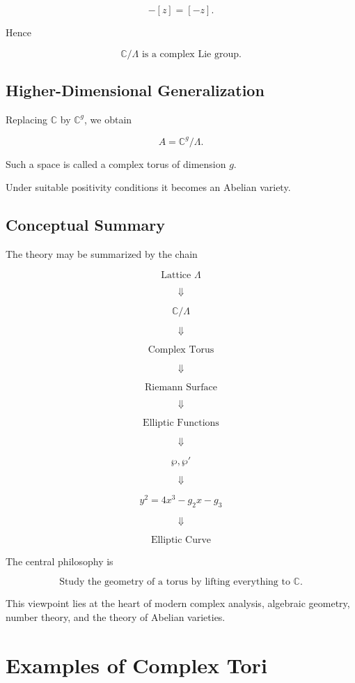 \documentclass[12pt,a4paper]{article}
\theoremstyle{notespace}
\begin{document}
\[
-[z]=[-z].
\]

Hence

\[
\boxed{
	\mathbb C/\Lambda
	\text{ is a complex Lie group.}
}
\]

\subsection{Higher-Dimensional Generalization}

Replacing \(\mathbb C\) by \(\mathbb C^g\), we obtain

\[
A
=
\mathbb C^g/\Lambda.
\]

Such a space is called a complex torus of dimension \(g\).

Under suitable positivity conditions it becomes an Abelian variety.

\subsection{Conceptual Summary}

The theory may be summarized by the chain

\[
\boxed{\text{Lattice } \Lambda}
\]

\[
\Downarrow
\]

\[
\boxed{\mathbb C/\Lambda}
\]

\[
\Downarrow
\]

\[
\boxed{\text{Complex Torus}}
\]

\[
\Downarrow
\]

\[
\boxed{\text{Riemann Surface}}
\]

\[
\Downarrow
\]

\[
\boxed{\text{Elliptic Functions}}
\]

\[
\Downarrow
\]

\[
\boxed{\wp,\wp'}
\]

\[
\Downarrow
\]

\[
\boxed{y^2=4x^3-g_2x-g_3}
\]

\[
\Downarrow
\]

\[
\boxed{\text{Elliptic Curve}}
\]

The central philosophy is

\[
\boxed{
	\text{Study the geometry of a torus by lifting everything to }
	\mathbb C.
}
\]

This viewpoint lies at the heart of modern complex analysis, algebraic geometry, number theory, and the theory of Abelian varieties.

\section{Examples of Complex Tori}
\end{document}
